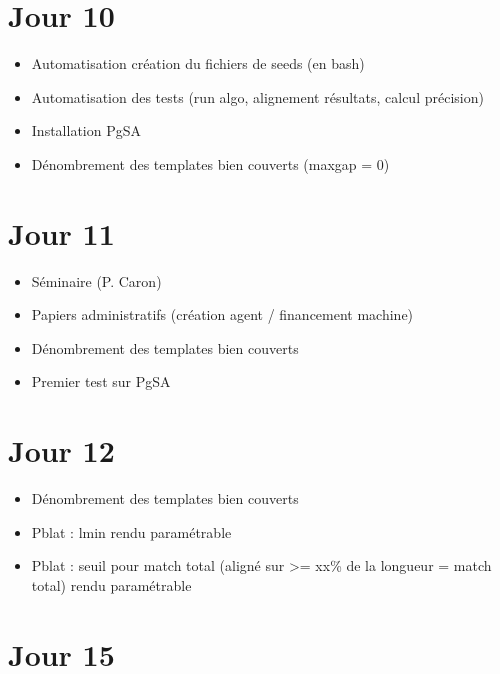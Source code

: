 \documentclass[12pt]{report}
\begin{document}
\section{Jour 10}

\begin{itemize}
  \item Automatisation création du fichiers de seeds (en bash)

  \item Automatisation des tests (run algo, alignement résultats, calcul précision)

  \item Installation PgSA

  \item Dénombrement des templates bien couverts (maxgap = 0)
\end{itemize}

\section{Jour 11}

\begin{itemize}
  \item Séminaire (P. Caron)

  \item Papiers administratifs (création agent / financement machine)

  \item Dénombrement des templates bien couverts

  \item Premier test sur PgSA
\end{itemize}

\section{Jour 12}

\begin{itemize}
  \item Dénombrement des templates bien couverts

  \item Pblat : lmin rendu paramétrable

  \item Pblat : seuil pour match total (aligné sur >= xx\% de la longueur = match total) rendu paramétrable
\end{itemize}

\section{Jour 15}
\end{document}
